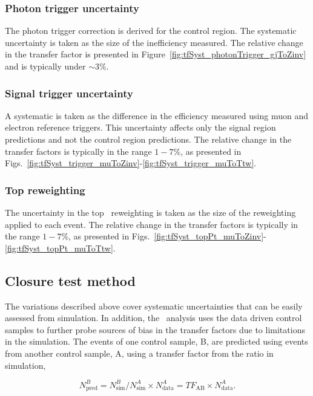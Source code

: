\subsubsection{Photon trigger uncertainty}
\label{sec:tfSyst_pho}
The photon trigger correction is derived for the \gj control region. The systematic uncertainty is
taken as the size of the inefficiency measured. The relative change in the \gj transfer factor 
is presented in Figure~\ref{fig:tfSyst_photonTrigger_gjToZinv} and is typically under $\sim3\%$.

\subsubsection{Signal trigger uncertainty}
\label{sec:tfSyst_trigger}

A systematic is taken as the difference in the efficiency measured using muon and 
electron reference triggers. This uncertainty affects only the signal region predictions
and not the control region predictions. The relative change in the transfer factors is typically in the range
$1-7\%$, as presented in Figs.~\ref{fig:tfSyst_trigger_muToZinv}-\ref{fig:tfSyst_trigger_muToTtw}.

\subsubsection{Top \pt reweighting}
\label{sec:topSyst}
The uncertainty in the top \pt~reweighting is taken as the size of the reweighting
applied to each event. The relative change in the transfer factors is typically in the range
$1-7\%$, as presented in Figs.~\ref{fig:tfSyst_topPt_muToZinv}-\ref{fig:tfSyst_topPt_muToTtw}.  

\subsection{Closure test method}
\label{sec:closure-tests}
The variations described above cover systematic uncertainties that can be easily assessed 
from simulation. In addition, the \alphat~analysis uses the data driven control samples to
further probe sources of bias in the transfer factors due to limitations in the simulation.
The events of one control sample, B, are predicted using events from another control sample, A,
using a transfer factor from the ratio in simulation, 

\begin{equation}
\label{equ:abPred}
N^{B}_{\text{pred}} = N^{B}_{\text{sim}}/N^{A}_{\text{sim}} \times N^{A}_{\text{data}} = TF_{\text{AB}} \times N^{A}_{\text{data}}.
\end{equation}


